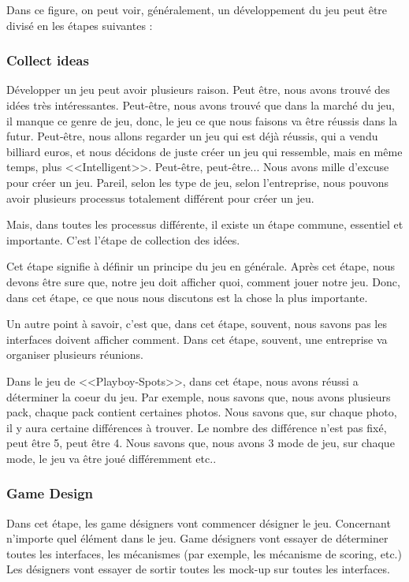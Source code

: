 Dans ce figure, on peut voir, généralement, un développement du jeu peut être divisé en les étapes suivantes :

\subsubsection{Collect ideas} %

Développer un jeu peut avoir plusieurs raison. Peut être, nous avons trouvé des idées très intéressantes. Peut-être, nous avons trouvé que dans la marché du jeu, il manque ce genre de jeu, donc, le jeu ce que nous faisons va être réussis dans la futur. Peut-être, nous allons regarder un jeu qui est déjà réussis, qui a vendu billiard euros, et nous décidons de juste créer un jeu qui ressemble, mais en même temps, plus <<Intelligent>>. Peut-être, peut-être... Nous avons mille d'excuse pour créer un jeu. Pareil, selon les type de jeu, selon l'entreprise, nous pouvons avoir plusieurs processus totalement différent pour créer un jeu. 

Mais, dans toutes les processus différente, il existe un étape commune, essentiel et importante. C'est l'étape de collection des idées. 

Cet étape signifie à définir un principe du jeu en générale. Après cet étape, nous devons être sure que, notre jeu doit afficher quoi, comment jouer notre jeu. Donc, dans cet étape, ce que nous nous discutons est la chose la plus importante. 

Un autre point à savoir, c'est que, dans cet étape, souvent, nous savons pas les interfaces doivent afficher comment. Dans cet étape, souvent, une entreprise va organiser plusieurs réunions.

Dans le jeu de <<Playboy-Spots>>, dans cet étape, nous avons réussi a déterminer la coeur du jeu. Par exemple, nous savons que, nous avons plusieurs pack, chaque pack contient certaines photos. Nous savons que, sur chaque photo, il y aura certaine différences à trouver. Le nombre des différence n'est pas fixé, peut être 5, peut être 4. Nous savons que, nous avons 3 mode de jeu, sur chaque mode, le jeu va être joué différemment etc..


\subsubsection{Game Design} %

Dans cet étape, les game désigners vont commencer désigner le jeu. Concernant n'importe quel élément dans le jeu. Game désigners vont essayer de déterminer toutes les interfaces, les mécanismes (par exemple, les mécanisme de scoring, etc.) Les désigners vont essayer de sortir toutes les mock-up sur toutes les interfaces. 

